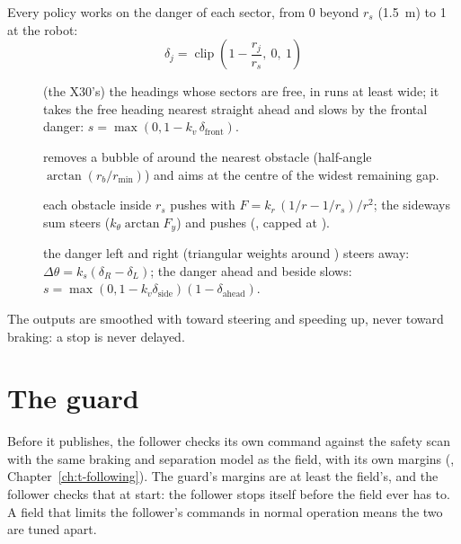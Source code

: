 Every policy works on the danger of each sector, from 0 beyond  $r_s$
(\SI{1.5}{m}) to 1 at the robot:
\begin{equation}
  \delta_j = \operatorname{clip}\!\left(1 - \frac{r_j}{r_s},\ 0,\ 1\right)
\end{equation}

\begin{description}
  \item[] (the X30's) the headings whose sectors are free, in runs at least
     wide; it takes the free heading nearest straight ahead and slows by
    the frontal danger: $s = \max(0, 1 - k_v\,\delta_{\text{front}})$.
  \item[] removes a bubble of  around the nearest obstacle
    (half-angle $\arctan(r_b/r_{\min})$) and aims at the centre of the widest remaining gap.
  \item[] each obstacle inside $r_s$ pushes with
    $F = k_r\,(1/r - 1/r_s)/r^2$; the sideways sum steers ($k_\theta\arctan F_y$) and pushes
    (, capped at ).
  \item[] the danger left and right (triangular weights around
    ) steers away: $\Delta\theta = k_s(\delta_R - \delta_L)$; the
    danger ahead and beside slows: $s = \max(0, 1 - k_v\delta_{\text{side}})(1 - \delta_{\text{ahead}})$.
\end{description}

The outputs are smoothed with  toward steering and speeding up, never
toward braking: a stop is never delayed.

\section{The guard}

Before it publishes, the follower checks its own command against the safety scan with the same
braking and separation model as the field, with its own margins (,
Chapter~\ref{ch:t-following}). The guard's margins are at least the field's, and the follower
checks that at start: the follower stops itself before the field ever has to. A field that limits
the follower's commands in normal operation means the two are tuned apart.
